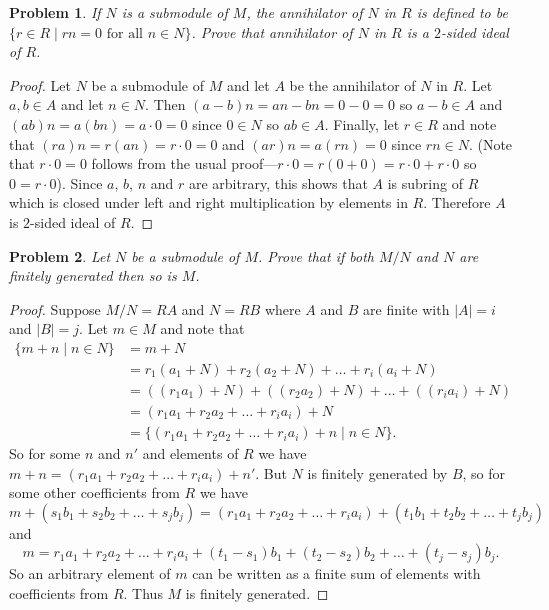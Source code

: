 \documentclass{article}
\newtheorem{problem}{Problem}
\begin{document}

\begin{problem}
If $N$ is a submodule of $M$, the \emph{annihilator of $N$ in $R$} is defined to be $\{r \in R \mid rn = 0 \text{ for all } n \in N\}$. Prove that annihilator of $N$ in $R$ is a $2$-sided ideal of $R$.
\end{problem}
\begin{proof}
Let $N$ be a submodule of $M$ and let $A$ be the annihilator of $N$ in $R$. Let $a,b \in A$ and let $n \in N$. Then $(a-b)n = an-bn = 0-0 = 0$ so $a-b \in A$ and $(ab)n = a(bn) = a \cdot 0 = 0$ since $0 \in N$ so $ab \in A$. Finally, let $r \in R$ and note that $(ra)n = r(an) = r \cdot 0 = 0$ and $(ar)n = a(rn) = 0$ since $rn \in N$. (Note that $r \cdot 0 = 0$ follows from the usual proof---$r \cdot 0 = r(0 + 0) = r \cdot 0 + r \cdot 0$ so $0 = r \cdot 0$). Since $a$, $b$, $n$ and $r$ are arbitrary, this shows that $A$ is subring of $R$ which is closed under left and right multiplication by elements in $R$. Therefore $A$ is $2$-sided ideal of $R$.
\end{proof}

\begin{problem}
Let $N$ be a submodule of $M$. Prove that if both $M/N$ and $N$ are finitely generated then so is $M$.
\end{problem}
\begin{proof}
Suppose $M/N = RA$ and $N = RB$ where $A$ and $B$ are finite with $|A| = i$ and $|B| = j$. Let $m \in M$ and note that
\begin{align*}
\{m + n \mid n \in N\}
&= m+N\\
&= r_1(a_1 + N) + r_2(a_2 + N) + \dots + r_i(a_i + N)\\
&= ((r_1a_1) + N) + ((r_2a_2) + N) + \dots + ((r_ia_i) + N)\\
&= (r_1a_1 + r_2a_2 + \dots + r_ia_i) + N\\
&= \{(r_1a_1 + r_2a_2 + \dots + r_ia_i) + n \mid n \in N\}.
\end{align*}
So for some $n$ and $n'$ and elements of $R$ we have $m + n = (r_1a_1 + r_2a_2 + \dots + r_ia_i) + n'$. But $N$ is finitely generated by $B$, so for some other coefficients from $R$ we have
\[
m + (s_1b_1 + s_2b_2 + \dots + s_jb_j) = (r_1a_1 + r_2a_2 + \dots + r_ia_i) + (t_1b_1 + t_2b_2 + \dots + t_jb_j)
\]
and
\[
m = r_1a_1 + r_2a_2 + \dots + r_ia_i + (t_1-s_1)b_1 + (t_2-s_2)b_2 + \dots + (t_j-s_j)b_j.
\]
So an arbitrary element of $m$ can be written as a finite sum of elements with coefficients from $R$. Thus $M$ is finitely generated.
\end{proof}
\end{document}
